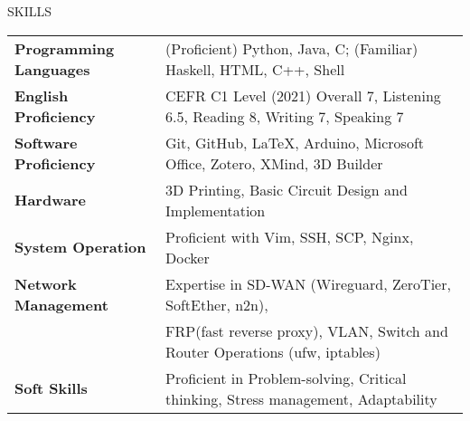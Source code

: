\documentclass{resume} %
\begin{document}
\begin{rSection}{SKILLS}

    \begin{tabular}{ @{} >{\bfseries}l @{\hspace{6ex}} l }
    Programming Languages & (Proficient) Python, Java, C; (Familiar) Haskell, HTML, C++, Shell
    \\
    English Proficiency & CEFR C1 Level (2021) Overall 7, Listening 6.5, Reading 8, Writing 7, Speaking 7
    \\
    Software Proficiency & Git, GitHub, \LaTeX, Arduino, Microsoft Office, Zotero, XMind, 3D Builder
    \\
    Hardware & 3D Printing, Basic Circuit Design and Implementation
    \\
    System Operation & Proficient with Vim, SSH, SCP, Nginx, Docker
    \\
    Network Management & Expertise in SD-WAN (Wireguard, ZeroTier, SoftEther, n2n), \\ 
    & FRP(fast reverse proxy), VLAN, Switch and Router Operations (ufw, iptables)\\
    Soft Skills & Proficient in Problem-solving, Critical thinking, Stress management, Adaptability
    \end{tabular}
\end{rSection}
    
\end{document}
